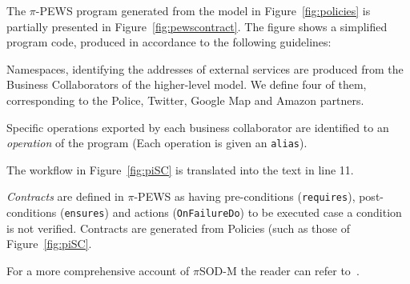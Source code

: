 The $\pi$-PEWS program generated from the model in Figure~\ref{fig:policies} is partially presented in Figure~\ref{fig:pewscontract}. 
The figure shows a simplified program code, produced in accordance to the following guidelines:
\begin{numtrivlist}
\item Namespaces, identifying the addresses of external services are produced from the Business Collaborators of the higher-level model. 
We define four of them, corresponding to the Police, Twitter, Google Map and Amazon partners.
\item Specific operations exported by each business collaborator are identified to an \textit{operation} of the program (Each operation is given an \texttt{alias}).
\item The workflow in Figure~\ref{fig:piSC} is translated into the text in line 11.
\item \textit{Contracts} are defined in $\pi$-PEWS as having pre-conditions (\texttt{requires}), post-conditions (\texttt{ensures}) and actions (\texttt{OnFailureDo}) to be executed case a condition is not verified. 
Contracts are generated from Policies (such as those of Figure~\ref{fig:piSC}.
\end{numtrivlist}

For a more comprehensive account of $\pi$SOD-M the reader can refer to~\cite{PlacidoThesis2012}.

